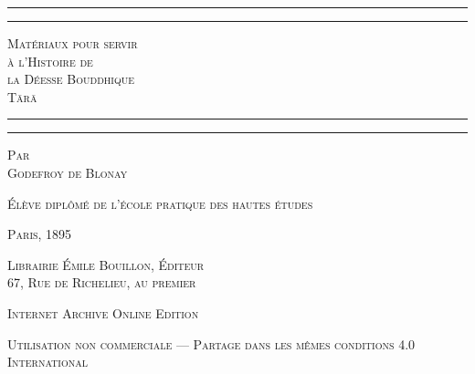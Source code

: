 \documentclass[a4paper, 11pt, oneside, french, landscape, twocolumn]{article}
\begin{document}
\renewcommand\thefootnote{{\bfseries\color{customColor}{\arabic{footnote}}}}
\let\oldfootnote\footnote
    \renewcommand{\footnote}[1]{\oldfootnote{{\bfseries\color{customColor}#1}}}
\begin{titlepage} %
	\centering %

	
	\rule{\textwidth}{1.6pt}\vspace*{-\baselineskip}\vspace*{2pt} %
	\rule{\textwidth}{0.4pt} %
	
	\vspace{1\baselineskip} %

	{\scshape\Huge Matériaux pour servir\\ à l'Histoire de \\la Déesse Bouddhique \\T\={a}r\={a}}
	
	\vspace{1\baselineskip} %

	\rule{\textwidth}{0.4pt}\vspace*{-\baselineskip}\vspace{3.2pt} %
	\rule{\textwidth}{1.6pt} %
	
	\vspace{1\baselineskip} %
	
	
	{\scshape Par \\\Large Godefroy de Blonay} %
	
	\vspace*{1\baselineskip} %
	
        {\scshape Élève diplômé de l'école pratique des hautes études} %
    
        \vspace*{\fill}

	\vspace{1\baselineskip}

	{\small\scshape Paris, 1895}
	
	{\small\scshape{Librairie Émile Bouillon, Éditeur\\67, Rue de Richelieu, au premier}}
	
	\vspace{0.5\baselineskip} %

        \scshape Internet Archive Online Edition  %
	
	{\scshape\small Utilisation non commerciale --- Partage dans les mêmes conditions 4.0 International} %
\end{titlepage}
\end{document}
